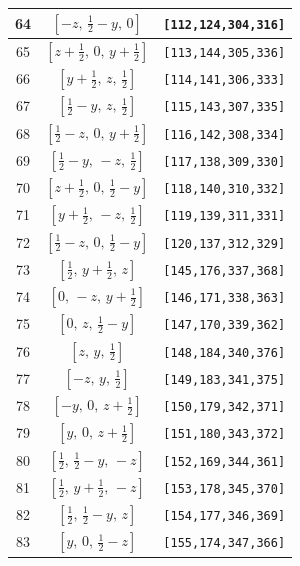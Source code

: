 \documentclass[fleqn,8pt]{jsarticle}
\begin{document}
\begin{longtable}{ccc}
64 & $\left[ - z,\, \frac{1}{2} - y,\, 0 \right]$ & {\tt [112,124,304,316]} \\ \hline
65 & $\left[ z + \frac{1}{2},\, 0,\, y + \frac{1}{2} \right]$ & {\tt [113,144,305,336]} \\ \hline
66 & $\left[ y + \frac{1}{2},\, z,\, \frac{1}{2} \right]$ & {\tt [114,141,306,333]} \\ \hline
67 & $\left[ \frac{1}{2} - y,\, z,\, \frac{1}{2} \right]$ & {\tt [115,143,307,335]} \\ \hline
68 & $\left[ \frac{1}{2} - z,\, 0,\, y + \frac{1}{2} \right]$ & {\tt [116,142,308,334]} \\ \hline
69 & $\left[ \frac{1}{2} - y,\, - z,\, \frac{1}{2} \right]$ & {\tt [117,138,309,330]} \\ \hline
70 & $\left[ z + \frac{1}{2},\, 0,\, \frac{1}{2} - y \right]$ & {\tt [118,140,310,332]} \\ \hline
71 & $\left[ y + \frac{1}{2},\, - z,\, \frac{1}{2} \right]$ & {\tt [119,139,311,331]} \\ \hline
72 & $\left[ \frac{1}{2} - z,\, 0,\, \frac{1}{2} - y \right]$ & {\tt [120,137,312,329]} \\ \hline
73 & $\left[ \frac{1}{2},\, y + \frac{1}{2},\, z \right]$ & {\tt [145,176,337,368]} \\ \hline
74 & $\left[ 0,\, - z,\, y + \frac{1}{2} \right]$ & {\tt [146,171,338,363]} \\ \hline
75 & $\left[ 0,\, z,\, \frac{1}{2} - y \right]$ & {\tt [147,170,339,362]} \\ \hline
76 & $\left[ z,\, y,\, \frac{1}{2} \right]$ & {\tt [148,184,340,376]} \\ \hline
77 & $\left[ - z,\, y,\, \frac{1}{2} \right]$ & {\tt [149,183,341,375]} \\ \hline
78 & $\left[ - y,\, 0,\, z + \frac{1}{2} \right]$ & {\tt [150,179,342,371]} \\ \hline
79 & $\left[ y,\, 0,\, z + \frac{1}{2} \right]$ & {\tt [151,180,343,372]} \\ \hline
80 & $\left[ \frac{1}{2},\, \frac{1}{2} - y,\, - z \right]$ & {\tt [152,169,344,361]} \\ \hline
81 & $\left[ \frac{1}{2},\, y + \frac{1}{2},\, - z \right]$ & {\tt [153,178,345,370]} \\ \hline
82 & $\left[ \frac{1}{2},\, \frac{1}{2} - y,\, z \right]$ & {\tt [154,177,346,369]} \\ \hline
83 & $\left[ y,\, 0,\, \frac{1}{2} - z \right]$ & {\tt [155,174,347,366]} \\ \hline

\end{longtable}
\end{document}
